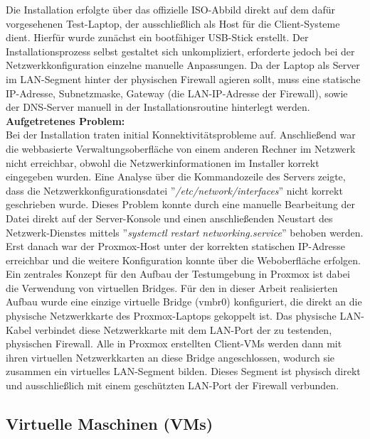 Die Installation erfolgte über das offizielle ISO-Abbild direkt auf dem dafür vorgesehenen Test-Laptop, der ausschließlich als Host für die Client-Systeme dient. Hierfür wurde zunächst ein bootfähiger USB-Stick erstellt. Der Installationsprozess selbst gestaltet sich unkompliziert, erforderte jedoch bei der Netzwerkkonfiguration einzelne manuelle Anpassungen. Da der Laptop als Server im LAN-Segment hinter der physischen Firewall agieren sollt, muss eine statische IP-Adresse, Subnetzmaske, Gateway (die LAN-IP-Adresse der Firewall), sowie der DNS-Server manuell in der Installationsroutine hinterlegt werden.\\

\textbf{Aufgetretenes Problem:}\\
Bei der Installation  traten initial Konnektivitätsprobleme auf. Anschließend war die webbasierte Verwaltungsoberfläche von einem anderen Rechner im Netzwerk nicht erreichbar, obwohl die Netzwerkinformationen im Installer korrekt eingegeben wurden. Eine Analyse über die Kommandozeile des Servers zeigte, dass die Netzwerkkonfigurationsdatei ''\textit{/etc/network/interfaces}'' nicht korrekt geschrieben wurde. Dieses Problem konnte durch eine manuelle Bearbeitung der Datei direkt auf der Server-Konsole und einen anschließenden Neustart des Netzwerk-Dienstes mittels ''\textit{systemctl restart networking.service}'' behoben werden. Erst danach war der Proxmox-Host unter der korrekten statischen IP-Adresse erreichbar und die weitere Konfiguration konnte über die Weboberfläche erfolgen.\\

Ein zentrales Konzept für den Aufbau der Testumgebung in Proxmox ist dabei die Verwendung von virtuellen Bridges. Für den in dieser Arbeit realisierten Aufbau wurde eine einzige virtuelle Bridge (vmbr0) konfiguriert, die direkt an die physische Netzwerkkarte des Proxmox-Laptops gekoppelt ist. Das physische LAN-Kabel verbindet diese Netzwerkkarte mit dem LAN-Port der zu testenden, physischen Firewall. Alle in Proxmox erstellten Client-VMs werden dann mit ihren virtuellen Netzwerkkarten an diese Bridge angeschlossen, wodurch sie zusammen ein virtuelles LAN-Segment bilden. Dieses Segment ist physisch direkt und ausschließlich mit einem geschützten LAN-Port der Firewall verbunden.\\


\subsection{Virtuelle Maschinen (VMs)}

